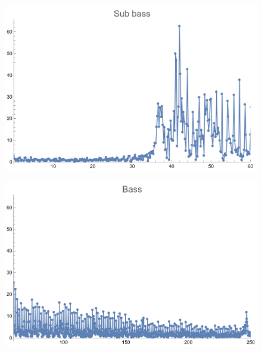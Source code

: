 \documentclass[12pt, letterpaper]{article}
\begin{document}
\begin{figure}[H]
  \centering
  \begin{minipage}{.5\textwidth}
    \centering
    \includegraphics[width=.9\linewidth]{imgs/Cancion2/subbass.png}
    \label{fig:02b}
  \end{minipage}%
  \begin{minipage}{.5\textwidth}
    \centering
    \includegraphics[width=.9\linewidth]{imgs/Cancion2/bass.png}
    \label{fig:02c}
  \end{minipage}
\end{figure}
\end{document}
